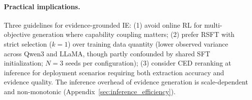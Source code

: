 \paragraph{Practical implications.}
Three guidelines for evidence-grounded IE: (1) avoid online RL for multi-objective generation where capability coupling matters; (2) prefer RSFT with strict selection ($k{=}1$) over training data quantity (lower observed variance across Qwen3 and LLaMA, though partly confounded by shared SFT initialization; $N{=}3$ seeds per configuration); (3) consider CED reranking at inference for deployment scenarios requiring both extraction accuracy and evidence quality. The inference overhead of evidence generation is scale-dependent and non-monotonic (Appendix~\ref{sec:inference_efficiency}).
